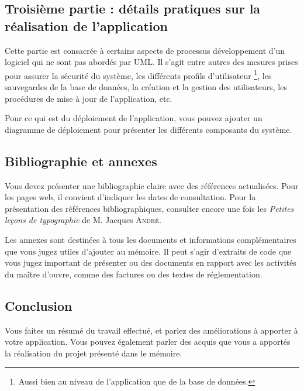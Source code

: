 \documentclass[12pt]{article}
\begin{document}
\subsection{Troisième partie : détails pratiques sur la réalisation de l'application}
Cette partie est consacrée à certains aspects de processus développement d'un logiciel qui ne sont pas abordés par UML. Il s'agit entre autres des mesures prises pour assurer la sécurité du système, les différents profils d'utilisateur \footnote{Aussi bien au niveau de l'application que de la base de données.}, les sauvegardes de la base de données, la création et la gestion des utilisateurs, les procédures de mise à jour de l'application, etc. 

Pour ce qui est du déploiement de l'application, vous pouvez ajouter un diagramme de déploiement pour présenter les différents composants du système.

\subsection{Bibliographie et annexes}
Vous devez présenter une bibliographie claire avec des références actualisées. Pour les pages web, il convient d'indiquer les dates de consultation. Pour la présentation des références bibliographiques, consulter encore une fois les \textit{Petites leçons de typographie} de M. Jacques \textsc{André}.

Les annexes sont destinées à tous les documents et informations complémentaires que vous jugez utiles d'ajouter au mémoire. Il peut s'agir d'extraits de code que vous jugez important de présenter ou des documents en rapport avec les activités du maître d'ouvre, comme des factures ou des textes de réglementation.

\subsection{Conclusion}
Vous faites un résumé du travail effectué, et parlez des améliorations à apporter à votre application. Vous pouvez également parler des acquis que vous a apportés la réalisation du projet présenté dans le mémoire.
\end{document}
